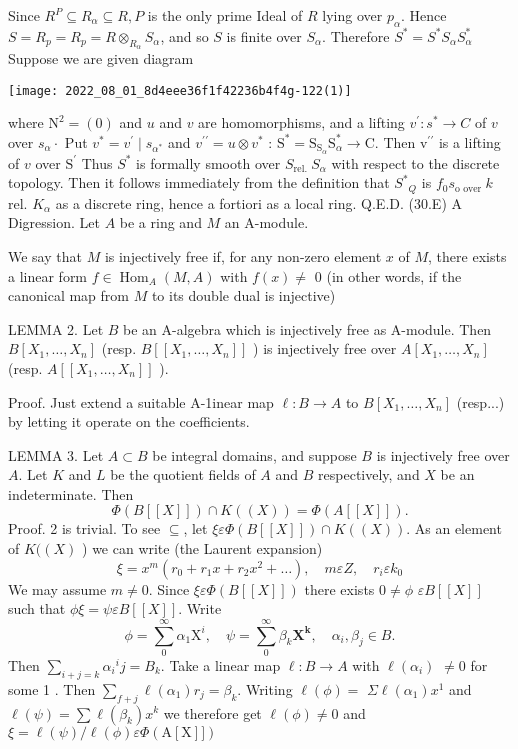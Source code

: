 Since $R^{P} \subseteq R_{\alpha} \subseteq R, P$ is the only prime Ideal of $R$ lying over $p_{\alpha}$. Hence $S=R_{p}=R_{p}=R \otimes_{R_{\alpha}} S_{\alpha}$, and so $S$ is finite over $S_{\alpha}$. Therefore $S^{*}=S^{*} S_{\alpha} S_{\alpha}^{*}$ Suppose we are given diagram

\texttt{[image: 2022\_08\_01\_8d4eee36f1f42236b4f4g-122(1)]}

where $\mathrm{N}^{2}=(0)$ and $u$ and $v$ are homomorphisms, and a lifting $v^{\prime}: s^{*} \rightarrow C$ of $v$ over $s_{\alpha} \cdot$ Put $v^{*}=v^{\prime} \mid s_{\alpha^{*}}$ and $v^{\prime \prime}=u \otimes v^{*}$ : $\mathrm{S}^{*}=\mathrm{S}_{\mathrm{S}_{\alpha}} \mathrm{S}_{\alpha}^{*} \rightarrow \mathrm{C} .$ Then $\mathrm{v}^{\prime \prime}$ is a lifting of $v$ over $\mathrm{S}^{\prime}$ Thus $S^{*}$ is formally smooth over $S_{\text {rel. }} S_{\alpha}$ with respect to the discrete topology. Then it follows immediately from the definition that $S^{*}{ }_{Q}$ is $f_{0} s_{\text {o over }} k$ rel. $K_{\alpha}$ as a discrete ring, hence a fortiori as a local ring. Q.E.D. (30.E) A Digression. Let $A$ be a ring and $M$ an A-module.

We say that $M$ is injectively free if, for any non-zero element $x$ of $M$, there exists a linear form $f \in \operatorname{Hom}_{A}(M, A)$ with $f(x) \neq$ 0 (in other words, if the canonical map from $M$ to its double dual is injective)

LEMMA 2. Let $B$ be an A-algebra which is injectively free as A-module. Then $B\left[X_{1}, \ldots, X_{n}\right]$ (resp. $B\left[\left[X_{1}, \ldots, X_{n}\right]\right]$ ) is injectively free over $A\left[X_{1}, \ldots, X_{n}\right]$ (resp. $A\left[\left[X_{1}, \ldots, X_{n}\right]\right]$ ).

Proof. Just extend a suitable A-1inear map $\ell: B \rightarrow A$ to $B\left[X_{1}, \ldots, X_{n}\right]$ (resp...) by letting it operate on the coefficients.

LEMMA 3. Let $A \subset B$ be integral domains, and suppose $B$ is injectively free over $A$. Let $K$ and $L$ be the quotient fields of $A$ and $B$ respectively, and $X$ be an indeterminate. Then
$$
\Phi(B[[X]]) \cap K((X))=\Phi(A[[X]]) .
$$
Proof. 2 is trivial. To see $\subseteq$, let $\xi \varepsilon \Phi(B[[X]]) \cap K((X))$. As an element of $K((X)$ ) we can write (the Laurent expansion)
$$
\xi=x^{m}\left(r_{0}+r_{1} x+r_{2} x^{2}+\ldots\right), \quad m \varepsilon Z, \quad r_{i} \varepsilon k_{0}
$$
We may assume $m \neq 0$. Since $\xi \varepsilon \Phi(B[[X]])$ there exists $0 \neq \phi$ $\varepsilon B[[X]]$ such that $\phi \xi=\psi \varepsilon B[[X]]$. Write
$$
\phi=\sum_{0}^{\infty} \alpha_{1} \mathrm{X}^{i}, \quad \psi=\sum_{0}^{\infty} \beta_{k} \mathbf{X}^{\mathbf{k}}, \quad \alpha_{i}, \beta_{j} \in B .
$$
Then $\sum_{i+j=k} \alpha_{i}{ }^{i} j=B_{k}$. Take a linear map $\ell: B \rightarrow A$ with $\ell\left(\alpha_{i}\right)$ $\neq 0$ for some 1 . Then $\sum_{f+j} \ell\left(\alpha_{1}\right) r_{j}=\beta_{k}$. Writing $\ell(\phi)=$ $\Sigma \ell\left(\alpha_{1}\right) x^{1}$ and $\ell(\psi)=\sum \ell\left(\beta_{k}\right) x^{k}$ we therefore get $\ell(\phi) \neq 0$ and $\xi=\ell(\psi) / \ell(\phi) \varepsilon \Phi(\mathrm{A}[\mathrm{X}]])$

